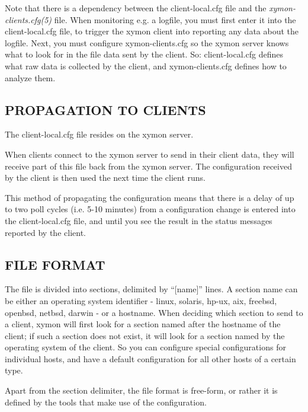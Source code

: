   Note that there is a dependency between the client-local.cfg file
  and the \emph{xymon-clients.cfg(5)} file. When monitoring e.g. a
  logfile, you must first enter it into the client-local.cfg file, to
  trigger the xymon client into reporting any data about the
  logfile. Next, you must configure xymon-clients.cfg so the xymon
  server knows what to look for in the file data sent by the
  client. So: client-local.cfg defines what raw data is collected by
  the client, and xymon-clients.cfg defines how to analyze them. 



 
\subsection{PROPAGATION TO CLIENTS}
 The client-local.cfg file resides on the xymon server. 

  When clients connect to the xymon server to send in their client
  data, they will receive part of this file back from the xymon
  server. The configuration received by the client is then used the
  next time the client runs. 



  This method of propagating the configuration means that there is a
  delay of up to two poll cycles (i.e. 5-10 minutes) from a
  configuration change is entered into the client-local.cfg file, and
  until you see the result in the status messages reported by the
  client. 



 
\subsection{FILE FORMAT}
 The file is divided into sections, delimited by ``[name]'' lines. A
 section name can be either an operating system identifier - linux,
 solaris, hp-ux, aix, freebsd, openbsd, netbsd, darwin - or a
 hostname. When deciding which section to send to a client, xymon
 will first look for a section named after the hostname of the client;
 if such a section does not exist, it will look for a section named by
 the operating system of the client. So you can configure special
 configurations for individual hosts, and have a default configuration
 for all other hosts of a certain type. 


  Apart from the section delimiter, the file format is free-form, or
  rather it is defined by the tools that make use of the
  configuration. 



